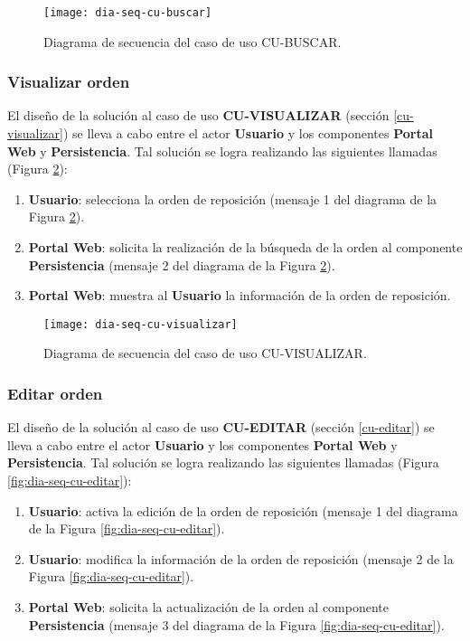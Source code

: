 \begin{figure}[h]
	\centering
	\texttt{[image: dia-seq-cu-buscar]}
	\caption{Diagrama de secuencia del caso de uso CU-BUSCAR.}
	\label{fig:dia-seq-cu-buscar}
\end{figure}

\subsubsection{Visualizar orden}
El diseño de la solución al caso de uso \textbf{CU-VISUALIZAR} (sección \ref{cu-visualizar}) se lleva a cabo entre el actor \textbf{Usuario} y los componentes \textbf{Portal Web} y \textbf{Persistencia}. Tal solución se logra realizando las siguientes llamadas (Figura \ref{fig:dia-seq-cu-visualizar}):
\begin{enumerate}
	\item \textbf{Usuario}: selecciona la orden de reposición (mensaje 1 del diagrama de la Figura \ref{fig:dia-seq-cu-visualizar}).
	\item \textbf{Portal Web}: solicita la realización de la búsqueda de la orden al componente \textbf{Persistencia} (mensaje 2 del diagrama de la Figura \ref{fig:dia-seq-cu-visualizar}).
	\item \textbf{Portal Web}: muestra al \textbf{Usuario} la información de la orden de reposición.
\end{enumerate}

\begin{figure}[h]
	\centering
	\texttt{[image: dia-seq-cu-visualizar]}
	\caption{Diagrama de secuencia del caso de uso CU-VISUALIZAR.}
	\label{fig:dia-seq-cu-visualizar}
\end{figure}

\subsubsection{Editar orden}
El diseño de la solución al caso de uso \textbf{CU-EDITAR} (sección \ref{cu-editar}) se lleva a cabo entre el actor \textbf{Usuario} y los componentes \textbf{Portal Web} y \textbf{Persistencia}. Tal solución se logra realizando las siguientes llamadas (Figura \ref{fig:dia-seq-cu-editar}):
\begin{enumerate}
	\item \textbf{Usuario}: activa la edición de la orden de reposición (mensaje 1 del diagrama de la Figura \ref{fig:dia-seq-cu-editar}).
	\item \textbf{Usuario}: modifica la información de la orden de reposición (mensaje 2 de la Figura \ref{fig:dia-seq-cu-editar}).
	\item \textbf{Portal Web}: solicita la actualización de la orden al componente \textbf{Persistencia} (mensaje 3 del diagrama de la Figura \ref{fig:dia-seq-cu-editar}).
\end{enumerate}

